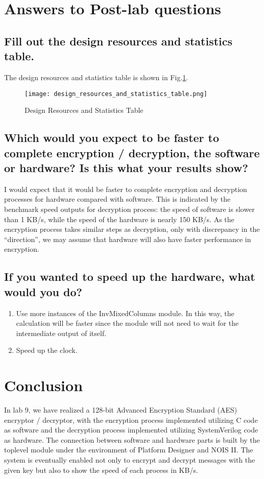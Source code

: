 \documentclass[11pt]{article}
\begin{document}
\section{Answers to Post-lab questions}
\subsection{Fill out the design resources and statistics table.}
The design resources and statistics table is shown in Fig.\ref{4_1}.
\begin{figure}[ht]
    \centering
    \texttt{[image: design\_resources\_and\_statistics\_table.png]}
    \caption{Design Resources and Statistics Table}
    \label{4_1}
\end{figure}

\subsection{Which would you expect to be faster to complete encryption / decryption, the software or hardware? Is this what your results show?}
I would expect that it would be faster to complete encryption and decryption processes for hardware compared with software. This is indicated by the benchmark speed outputs for decryption process: the speed of software is slower than 1 KB/s, while the speed of the hardware is nearly 150 KB/s. As the encryption process takes similar steps as decryption, only with discrepancy in the “direction”, we may assume that hardware will also have faster performance in encryption.

\subsection{If you wanted to speed up the hardware, what would you do?}
\begin{enumerate}
    \item Use more instances of the InvMixedColumns module. In this way, the calculation will be faster since the module will not need to wait for the intermediate output of itself.
    \item Speed up the clock.
\end{enumerate}

\section{Conclusion}
In lab 9, we have realized a 128-bit Advanced Encryption Standard (AES) encryptor / decryptor, with the encryption process implemented utilizing C code as software and the decryption process implemented utilizing SystemVerilog code as hardware. The connection between software and hardware parts is built by the toplevel module under the environment of Platform Designer and NOIS II. The system is eventually enabled not only to encrypt and decrypt messages with the given key but also to show the speed of each process in KB/s. 
\end{document}
